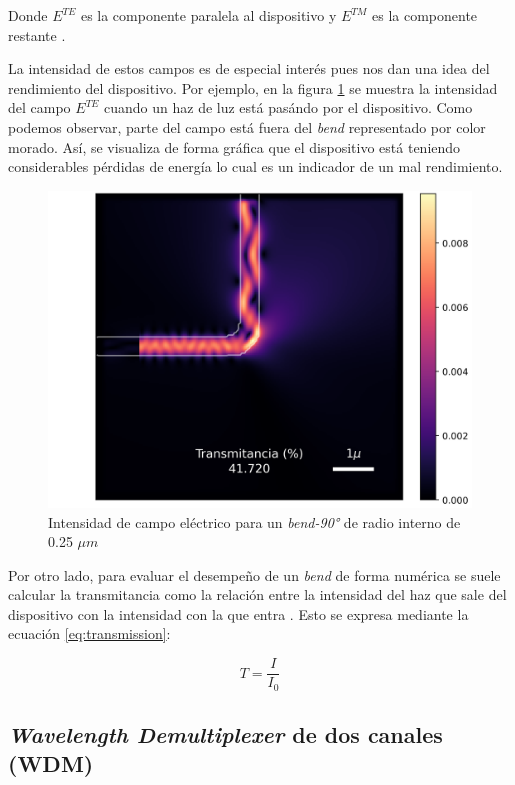 Donde $E^{TE}$ es la componente paralela al dispositivo y $E^{TM}$ es la componente restante \citep{Hohenester2020}. 

La intensidad de estos campos es de especial interés pues nos dan una idea del rendimiento del dispositivo. 
Por ejemplo, en la figura \ref{fig:efield} se muestra la intensidad del campo $E^{TE}$ cuando un haz de luz está pasándo por el dispositivo. 
Como podemos observar, parte del campo está fuera del \emph{bend} representado por color morado.
Así, se visualiza de forma gráfica que el dispositivo está teniendo considerables pérdidas de energía lo cual es un indicador de un mal rendimiento.


\begin{figure}[ht]
  \centering
  \includegraphics[scale=0.8]{image/theory/bend-field.png}
  \caption{Intensidad de campo eléctrico para un \emph{bend-90°} de radio interno de 0.25 $\mu m$}
  \label{fig:efield}
\end{figure}

Por otro lado, para evaluar el desempeño de un \emph{bend} de forma numérica se suele calcular la transmitancia como la relación entre la intensidad del haz que sale del dispositivo con la intensidad con la que entra \citep{Su2020}. Esto se expresa mediante la ecuación \ref{eq:transmission}:

\begin{equation}
  T = \frac{I}{I_0}
\label{eq:transmission}
\end{equation}


\subsection{\emph{Wavelength Demultiplexer} de dos canales (WDM)}

